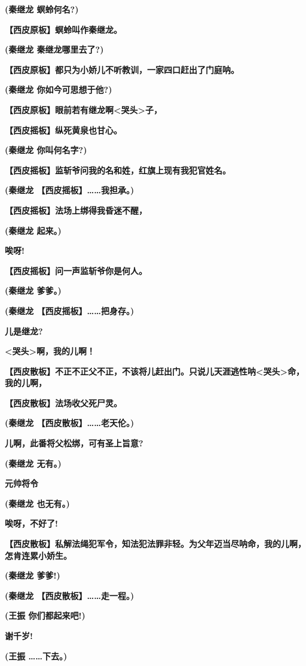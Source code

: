 \textbf{(秦继龙 螟蛉何名?)}

\textbf{【西皮原板】螟蛉叫作秦继龙。}

\textbf{(秦继龙 秦继龙哪里去了?)}

\textbf{【西皮原板】都只为小娇儿不听教训，一家四口赶出了门庭呐。}

\textbf{(秦继龙 你如今可思想于他?)}

\textbf{【西皮原板】眼前若有继龙啊\textless{}哭头\textgreater{}子，}

\textbf{【西皮摇板】纵死黄泉也甘心。}

\textbf{(秦继龙 你叫何名字?)}

\textbf{【西皮摇板】监斩爷问我的名和姓，红旗上现有我犯官姓名。}

\textbf{(秦继龙 【西皮摇板】\ldots{}\ldots{}我担承。)}

\textbf{【西皮摇板】法场上绑得我昏迷不醒，}

\textbf{(秦继龙 起来。)}

\textbf{唉呀!}

\textbf{【西皮摇板】问一声监斩爷你是何人。}

\textbf{(秦继龙 爹爹。)}

\textbf{(秦继龙 【西皮摇板】\ldots{}\ldots{}把身存。)}

\textbf{儿是继龙?}

\textbf{\textless{}哭头\textgreater{}啊，我的儿啊！}

\textbf{【西皮散板】不正不正父不正，不该将儿赶出门。只说儿天涯逃性呐\textless{}哭头\textgreater{}命，我的儿啊，}

\textbf{【西皮散板】法场收父死尸灵。}

\textbf{(秦继龙 【西皮散板】\ldots{}\ldots{}老天伦。)}

\textbf{儿啊，此番将父松绑，可有圣上旨意?}

\textbf{(秦继龙 无有。)}

\textbf{元帅将令}

\textbf{(秦继龙 也无有。)}

\textbf{唉呀，不好了!}

\textbf{【西皮散板】私解法绳犯军令，知法犯法罪非轻。为父年迈当尽呐命，我的儿啊，怎肯连累小娇生。}

\textbf{(秦继龙 爹爹!)}

\textbf{(秦继龙 【西皮散板】\ldots{}\ldots{}走一程。)}

\textbf{(王振 你们都起来吧!)}

\textbf{谢千岁!}

\textbf{(王振 \ldots{}\ldots{}下去。)}

